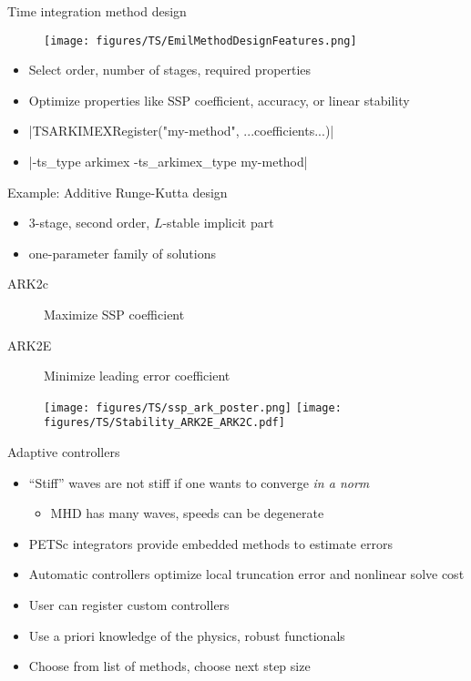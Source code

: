 \documentclass{beamer}
\begin{document}


\begin{frame}[fragile]{Time integration method design}
  \begin{figure}
    \centering
    \texttt{[image: figures/TS/EmilMethodDesignFeatures.png]}
  \end{figure}
  \begin{itemize}
  \item Select order, number of stages, required properties
  \item Optimize properties like SSP coefficient, accuracy, or linear stability
  \item \cverb|TSARKIMEXRegister("my-method", ...coefficients...)|
  \item \cverb|-ts_type arkimex -ts_arkimex_type my-method|
  \end{itemize}
\end{frame}

\begin{frame}{Example: Additive Runge-Kutta design}
  \begin{itemize}
  \item 3-stage, second order, $L$-stable implicit part
  \item one-parameter family of solutions
  \end{itemize}
  \begin{description}
  \item[ARK2c] Maximize SSP coefficient
  \item[ARK2E] Minimize leading error coefficient
  \end{description}
  \begin{figure}
    \centering
    \texttt{[image: figures/TS/ssp\_ark\_poster.png]}
    \texttt{[image: figures/TS/Stability\_ARK2E\_ARK2C.pdf]}
  \end{figure}
\end{frame}



\begin{frame}{Adaptive controllers}
  \begin{itemize}
  \item ``Stiff'' waves are not stiff if one wants to converge \emph{in a norm}
    \begin{itemize}
    \item MHD has many waves, speeds can be degenerate
    \end{itemize}
  \item PETSc integrators provide embedded methods to estimate errors
  \item Automatic controllers optimize local truncation error and nonlinear solve cost
  \item User can register custom controllers
  \item Use a priori knowledge of the physics, robust functionals
  \item Choose from list of methods, choose next step size
  \end{itemize}
\end{frame}
\end{document}
